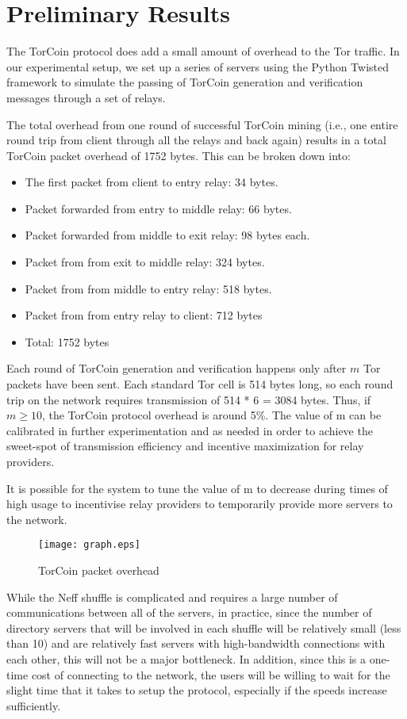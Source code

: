 \section{Preliminary Results}

The TorCoin protocol does add a small amount of overhead to the Tor traffic.
In our experimental setup, we set up a series of servers using the Python
Twisted framework to simulate the passing of TorCoin generation and
verification messages through a set of relays.

The total overhead from one round of successful TorCoin mining (i.e., one
entire round trip from client through all the relays and back again) results
in a total TorCoin packet overhead of 1752 bytes. This can be broken down
into:

\begin{itemize}
\item The first packet from client to entry relay: 34 bytes.
\item Packet forwarded from entry to middle relay: 66 bytes.
\item Packet forwarded from middle to exit relay: 98 bytes each.
\item Packet from from exit to middle relay: 324 bytes.
\item Packet from from middle to entry relay: 518 bytes.
\item Packet from from entry relay to client: 712 bytes
\item Total: 1752 bytes
\end{itemize}

Each round of TorCoin generation and verification happens only after $m$ Tor
packets have been sent. Each standard Tor cell is 514 bytes long, so each
round trip on the network requires transmission of 514 * 6 = 3084 bytes. Thus,
if $m \geq 10$, the TorCoin protocol overhead is around 5\%. The value of m
can be calibrated in further experimentation and as needed in order to achieve
the sweet-spot of transmission efficiency and incentive maximization for relay
providers.

It is possible for the system to tune the value of m to decrease during times
of high usage to incentivise relay providers to temporarily provide more
servers to the network.

\begin{figure}
  \centering
    \texttt{[image: graph.eps]}
  \caption{TorCoin packet overhead}
\end{figure}

While the Neff shuffle is complicated and requires a large number of
communications between all of the servers, in practice, since the number of
directory servers that will be involved in each shuffle will be relatively
small (less than 10) and are relatively fast servers with high-bandwidth
connections with each other, this will not be a major bottleneck. In addition,
since this is a one-time cost of connecting to the network, the users will be
willing to wait for the slight time that it takes to setup the protocol,
especially if the speeds increase sufficiently.
